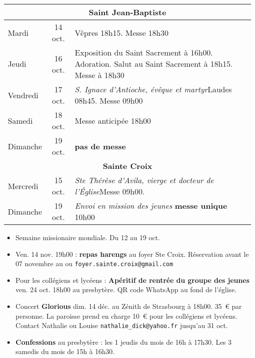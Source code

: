 \documentclass[french,11pt]{article}
\begin{document}
\begin{tabular} {lcp{9cm}}
\multicolumn{3}{c}{\textbf{Saint Jean-Baptiste} } \\ \hline
Mardi    & 14 oct.  & Vêpres 18h15. Messe 18h30 \\ \hline
Jeudi    & 16 oct. &
Exposition du Saint Sacrement à 16h00. Adoration. Salut au Saint Sacrement à 18h15. Messe à 18h30 
 \\ \hline
Vendredi & 17 oct. & \emph{S. Ignace d'Antioche, évêque et martyr}\newline Laudes 08h45. Messe 09h00 \\ \hline
Samedi   & 18 oct. & Messe anticipée 18h00 \\ \hline
Dimanche  & 19 oct. & \textbf{pas de messe}\\ \hline
\multicolumn{3}{c}{\textbf{Sainte Croix} } \\ \hline
Mercredi & 15 oct.  & \emph{Ste Thérèse d'Avila, vierge et docteur de l'Église}\newline Messe 09h00. \\ \hline
Dimanche  & 19 oct. & \emph{Envoi en mission des jeunes} \textbf{messe unique} 10h00\\ \hline
\end{tabular}

\begin{framed}
\begin{itemize}
\item
Semaine missionaire mondiale. Du 12 au 19 oct.
\item Ven. 14 nov. 19h00 : \textbf{repas harengs} au foyer Ste Croix. Réservation avant le 07 novembre au  ou \texttt{foyer.sainte.croix@gmail.com}
\item
Pour les collégiens et lycéens : \textbf{Apéritif de rentrée du groupe des jeunes} ven. 24 oct. 18h00 au presbytère. QR code WhatsApp au fond de l'église.
\item
Concert \textbf{Glorious} dim. 14 déc. au Zénith de Strasbourg à 18h00. 35~€ par personne. La paroisse prend en charge 10~€ pour les collégiens et lycéens. Contact Nathalie ou Louise \texttt{nathalie\_dick@yahoo.fr} jusqu'au 31 oct.
\item
\textbf{Confessions} au presbytère : les 1\iers{} jeudis du mois de 16h à 17h30. Les 3\iemes{} samedis du mois de 15h à 16h30.
\end{itemize}
\end{framed}
\end{document}
